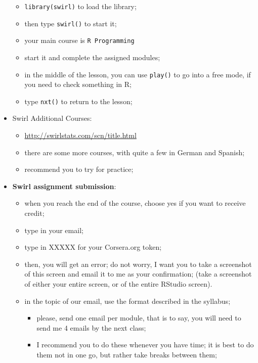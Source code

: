 \documentclass[
]{book}
\providecommand{\tightlist}{%
  \setlength{\itemsep}{0pt}\setlength{\parskip}{0pt}}
\begin{document}
\begin{itemize}
  \begin{itemize}
  \tightlist
  \item
    \texttt{library(swirl)} to load the library;
  \item
    then type \texttt{swirl()} to start it;
  \item
    your main course is \texttt{R\ Programming}
  \item
    start it and complete the assigned modules;
  \item
    in the middle of the lesson, you can use \texttt{play()} to go into a free mode, if you need to check something in R;
  \item
    type \texttt{nxt()} to return to the lesson;
  \end{itemize}
\item
  Swirl Additional Courses:

  \begin{itemize}
  \tightlist
  \item
    \url{http://swirlstats.com/scn/title.html}
  \item
    there are some more courses, with quite a few in German and Spanish;
  \item
    recommend you to try for practice;
  \end{itemize}
\item
  \textbf{Swirl assignment submission}:

  \begin{itemize}
  \tightlist
  \item
    when you reach the end of the course, choose yes if you want to receive credit;
  \item
    type in your email;
  \item
    type in XXXXX for your Corsera.org token;
  \item
    then, you will get an error; do not worry, I want you to take a screenshot of this screen and email it to me as your confirmation; (take a screenshot of either your entire screen, or of the entire RStudio screen).
  \item
    in the topic of our email, use the format described in the syllabus;

    \begin{itemize}
    \tightlist
    \item
      please, send one email per module, that is to say, you will need to send me 4 emails by the next class;
    \item
      I recommend you to do these whenever you have time; it is best to do them not in one go, but rather take breaks between them;
    \end{itemize}
  \end{itemize}
\end{itemize}
\end{document}
